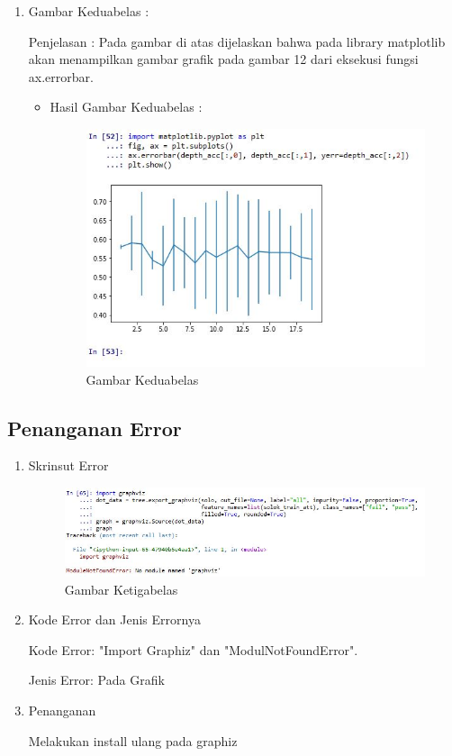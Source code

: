 \begin{itemize}
\begin{enumerate}
\begin{itemize}
\end{itemize}
\item  Gambar Keduabelas :
\par Penjelasan : Pada gambar di atas dijelaskan bahwa pada library matplotlib akan menampilkan gambar grafik pada gambar 12 dari eksekusi fungsi ax.errorbar.
\par 
\begin{itemize}
\par
\item Hasil  Gambar Keduabelas :

\begin{figure}[ht]
\centering
\includegraphics[scale=0.5]{figures/12.jpg}
\caption{ Gambar Keduabelas}
\label{12}
\end{figure}


\end{itemize}
\end{enumerate}

\end{itemize}

\subsection{Penanganan Error}
\begin{enumerate}
\item Skrinsut Error
\begin{figure}[ht]
\centering
\includegraphics[scale=0.5]{figures/6.jpg}
\caption{ Gambar Ketigabelas}
\label{6}
\end{figure}
\item Kode Error dan Jenis Errornya
\par Kode Error: "Import Graphiz" dan "ModulNotFoundError". 
\par Jenis Error: Pada Grafik
\item Penanganan
\par Melakukan install ulang pada graphiz

\end{enumerate}
